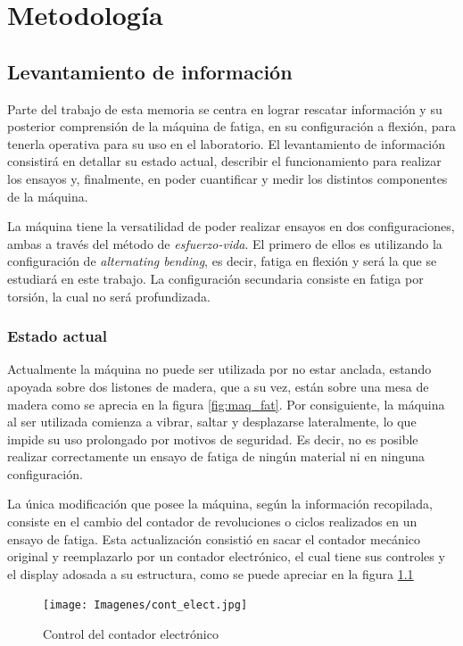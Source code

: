 \chapter{Metodología}
\section{Levantamiento de información}
\label{sec:lev_info}
Parte del trabajo de esta memoria se centra en lograr rescatar información y su posterior comprensión de la máquina de fatiga, en su configuración a flexión, para tenerla operativa para su uso en el laboratorio. El levantamiento de información consistirá en detallar su estado actual, describir el funcionamiento para realizar los ensayos y, finalmente, en poder cuantificar y medir los distintos componentes de la máquina.

La máquina tiene la versatilidad de poder realizar ensayos en dos configuraciones, ambas a través del método de \textit{esfuerzo-vida}. El primero de ellos es utilizando la configuración de \textit{alternating bending}, es decir, fatiga en flexión y será la que se estudiará en este trabajo. La configuración secundaria consiste en fatiga por torsión, la cual no será profundizada. 

\subsection{Estado actual}
Actualmente la máquina no puede ser utilizada por no estar anclada, estando apoyada sobre dos listones de madera, que a su vez, están sobre una mesa de madera como se aprecia en la figura \ref{fig:maq_fat}. Por consiguiente, la máquina al ser utilizada comienza a vibrar, saltar y desplazarse lateralmente, lo que impide su uso prolongado por motivos de seguridad. Es decir, no es posible realizar correctamente un ensayo de fatiga de ningún material ni en ninguna configuración.

La única modificación que posee la máquina, según la información recopilada, consiste en el cambio del contador de revoluciones o ciclos realizados en un ensayo de fatiga. Esta actualización consistió en sacar el contador mecánico original y reemplazarlo por un contador electrónico, el cual tiene sus controles y el display adosada a su estructura, como se puede apreciar en la figura \ref{fig:cont_elect}

\begin{figure}[h]
\centering
\texttt{[image: Imagenes/cont\_elect.jpg]}
\caption{Control del contador electrónico}
\label{fig:cont_elect}
\end{figure}

